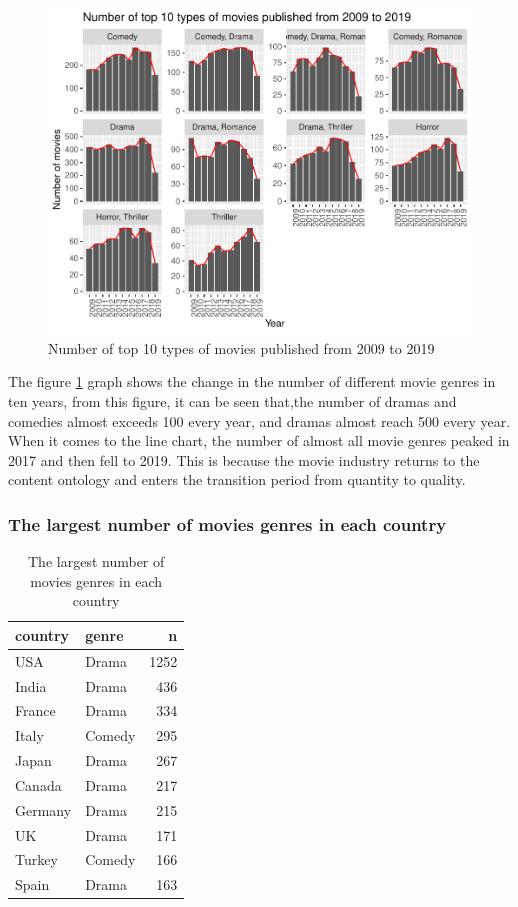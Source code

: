 \documentclass[11pt,a4paper,]{article}
\begin{document}
\begin{figure}
\centering
\includegraphics{Report_files/figure-latex/genresyear-1.pdf}
\caption{\label{fig:genresyear}Number of top 10 types of movies published from 2009 to 2019}
\end{figure}

The figure \ref{fig:genresyear} graph shows the change in the number of different movie genres in ten years, from this figure, it can be seen that,the number of dramas and comedies almost exceeds 100 every year, and dramas almost reach 500 every year. When it comes to the line chart, the number of almost all movie genres peaked in 2017 and then fell to 2019. This is because the movie industry returns to the content ontology and enters the transition period from quantity to quality.

\hypertarget{the-largest-number-of-movies-genres-in-each-country}{%
\subsubsection{The largest number of movies genres in each country}\label{the-largest-number-of-movies-genres-in-each-country}}

\begin{table}

\caption{\label{tab:maxgenres} The largest number of movies genres in each country}
\centering
\begin{tabular}[t]{llr}
\toprule
country & genre & n\\
\midrule
USA & Drama & 1252\\
India & Drama & 436\\
France & Drama & 334\\
Italy & Comedy & 295\\
Japan & Drama & 267\\
\addlinespace
Canada & Drama & 217\\
Germany & Drama & 215\\
UK & Drama & 171\\
Turkey & Comedy & 166\\
Spain & Drama & 163\\
\bottomrule
\end{tabular}
\end{table}
\end{document}
